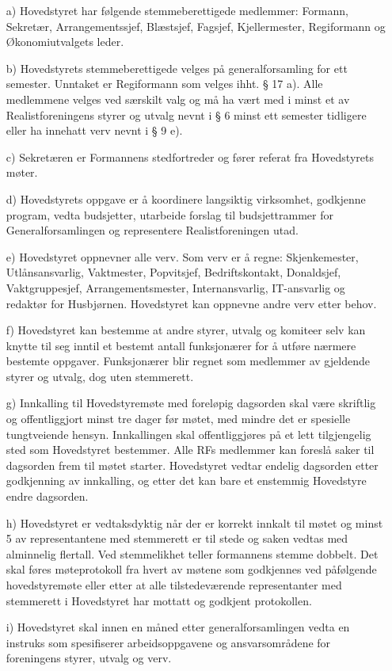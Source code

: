 \begin{itemize}

\item[a)] Hovedstyret har følgende stemmeberettigede medlemmer: Formann,
Sekretær, Arrangementssjef, Blæstsjef, Fagsjef, Kjellermester, Regiformann
og Økonomiutvalgets leder.

\item[b)] Hovedstyrets stemmeberettigede velges på generalforsamling for ett
semester. Unntaket er Regiformann som velges ihht. § 17 a).  Alle medlemmene velges ved særskilt valg og må ha vært med
i minst et av Realistforeningens styrer og utvalg nevnt i § 6 minst
ett semester tidligere eller ha innehatt verv nevnt i § 9 e).

\item[c)] Sekretæren er Formannens stedfortreder og fører referat fra
Hovedstyrets møter.

\item[d)] Hovedstyrets oppgave er å koordinere langsiktig virksomhet,
godkjenne program, vedta budsjetter, utarbeide forslag til budsjettrammer 
for Generalforsamlingen og representere Realistforeningen utad.

\item[e)] Hovedstyret oppnevner alle verv. Som verv er å regne:
Skjenkemester, Utlånsansvarlig, Vaktmester, Popvitsjef, Bedriftskontakt,
Donaldsjef, Vaktgruppesjef, Arrangementsmester, Internansvarlig,
IT-ansvarlig og redaktør for Husbjørnen. Hovedstyret kan oppnevne
andre verv etter behov.

\item[f)] Hovedstyret kan bestemme at andre styrer, utvalg og komiteer selv kan
knytte til seg inntil et bestemt antall funksjonærer for å utføre
nærmere bestemte oppgaver.  Funksjonærer blir regnet som medlemmer
av gjeldende styrer og utvalg, dog uten stemmerett.

\item[g)] Innkalling til Hovedstyremøte med foreløpig dagsorden skal være
skriftlig og offentliggjort minst tre dager før møtet, med mindre det
er spesielle tungtveiende hensyn. Innkallingen skal offentliggjøres på
et lett tilgjengelig sted som Hovedstyret bestemmer. Alle RFs
medlemmer kan foreslå saker til dagsorden frem til møtet starter.
Hovedstyret vedtar endelig dagsorden etter godkjenning av innkalling,
og etter det kan bare et enstemmig Hovedstyre endre dagsorden.

\item[h)] Hovedstyret er vedtaksdyktig når der er korrekt innkalt til møtet
og minst 5 av representantene med stemmerett er til stede og saken
vedtas med alminnelig flertall. Ved stemmelikhet teller formannens
stemme dobbelt. Det skal føres møteprotokoll fra hvert av møtene som
godkjennes ved påfølgende hovedstyremøte eller etter at alle
tilstedeværende representanter med stemmerett i Hovedstyret har
mottatt og godkjent protokollen.

\item[i)] Hovedstyret skal innen en måned etter generalforsamlingen vedta en
instruks som spesifiserer arbeidsoppgavene og ansvarsområdene for
foreningens styrer, utvalg og verv.

\end{itemize}


